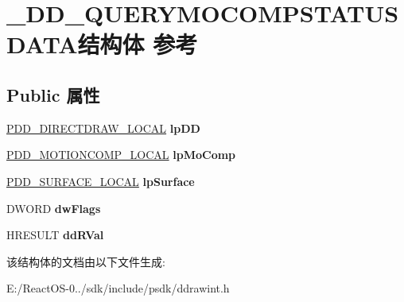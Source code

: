 \hypertarget{struct___d_d___q_u_e_r_y_m_o_c_o_m_p_s_t_a_t_u_s_d_a_t_a}{}\section{\+\_\+\+D\+D\+\_\+\+Q\+U\+E\+R\+Y\+M\+O\+C\+O\+M\+P\+S\+T\+A\+T\+U\+S\+D\+A\+T\+A结构体 参考}
\label{struct___d_d___q_u_e_r_y_m_o_c_o_m_p_s_t_a_t_u_s_d_a_t_a}
\subsection*{Public 属性}
\begin{DoxyCompactItemize}
\item 
\mbox{\label{struct___d_d___q_u_e_r_y_m_o_c_o_m_p_s_t_a_t_u_s_d_a_t_a_afe9a9c288204108480cc19484764b119}} 
\hyperlink{struct___d_d___d_i_r_e_c_t_d_r_a_w___l_o_c_a_l}{P\+D\+D\+\_\+\+D\+I\+R\+E\+C\+T\+D\+R\+A\+W\+\_\+\+L\+O\+C\+AL} {\bfseries lp\+DD}
\item 
\mbox{\label{struct___d_d___q_u_e_r_y_m_o_c_o_m_p_s_t_a_t_u_s_d_a_t_a_a0c365b31c4397ebd0823f558be63cffd}} 
\hyperlink{struct_d_d___m_o_t_i_o_n_c_o_m_p___l_o_c_a_l}{P\+D\+D\+\_\+\+M\+O\+T\+I\+O\+N\+C\+O\+M\+P\+\_\+\+L\+O\+C\+AL} {\bfseries lp\+Mo\+Comp}
\item 
\mbox{\label{struct___d_d___q_u_e_r_y_m_o_c_o_m_p_s_t_a_t_u_s_d_a_t_a_a532c27664bc4edf8b1234aaa5f6f7f63}} 
\hyperlink{struct___d_d___s_u_r_f_a_c_e___l_o_c_a_l}{P\+D\+D\+\_\+\+S\+U\+R\+F\+A\+C\+E\+\_\+\+L\+O\+C\+AL} {\bfseries lp\+Surface}
\item 
\mbox{\label{struct___d_d___q_u_e_r_y_m_o_c_o_m_p_s_t_a_t_u_s_d_a_t_a_a2566fa77063099432f6dac29dacbc1f9}} 
D\+W\+O\+RD {\bfseries dw\+Flags}
\item 
\mbox{\label{struct___d_d___q_u_e_r_y_m_o_c_o_m_p_s_t_a_t_u_s_d_a_t_a_a8d452ad5d3081e7c6bef6ea9c9c5ffde}} 
H\+R\+E\+S\+U\+LT {\bfseries dd\+R\+Val}
\end{DoxyCompactItemize}


该结构体的文档由以下文件生成\+:\begin{DoxyCompactItemize}
\item 
E\+:/\+React\+O\+S-\/0../sdk/include/psdk/ddrawint.\+h\end{DoxyCompactItemize}
